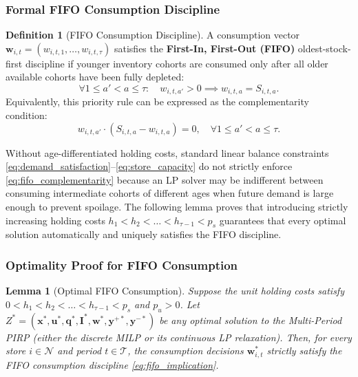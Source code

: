 \documentclass[11pt,a4paper]{article}
\newtheorem{lemma}{Lemma}
\theoremstyle{definition}
\newtheorem{definition}{Definition}
\theoremstyle{remark}
\begin{document}
\subsubsection{Formal FIFO Consumption Discipline}
\begin{definition}[FIFO Consumption Discipline]
\label{def:fifo_discipline}
A consumption vector $\mathbf{w}_{i,t} = (w_{i,t,1}, \dots, w_{i,t,\tau})$ satisfies the \textbf{First-In, First-Out (FIFO)} oldest-stock-first discipline if younger inventory cohorts are consumed only after all older available cohorts have been fully depleted:
\begin{equation}
    \forall 1 \le a' < a \le \tau: \quad w_{i,t,a'} > 0 \implies w_{i,t,a} = S_{i,t,a}. \label{eq:fifo_implication}
\end{equation}
Equivalently, this priority rule can be expressed as the complementarity condition:
\begin{equation}
    w_{i,t,a'} \cdot \left( S_{i,t,a} - w_{i,t,a} \right) = 0, \quad \forall 1 \le a' < a \le \tau. \label{eq:fifo_complementarity}
\end{equation}
\end{definition}

Without age-differentiated holding costs, standard linear balance constraints \eqref{eq:demand_satisfaction}--\eqref{eq:store_capacity} do not strictly enforce \eqref{eq:fifo_complementarity} because an LP solver may be indifferent between consuming intermediate cohorts of different ages when future demand is large enough to prevent spoilage. The following lemma proves that introducing strictly increasing holding costs $h_1 < h_2 < \dots < h_{\tau-1} < p_s$ guarantees that every optimal solution automatically and uniquely satisfies the FIFO discipline.

\subsubsection{Optimality Proof for FIFO Consumption}
\begin{lemma}[Optimal FIFO Consumption]
\label{lem:fifo_optimality}
Suppose the unit holding costs satisfy $0 < h_1 < h_2 < \dots < h_{\tau-1} < p_s$ and $p_u > 0$. Let $Z^* = (\mathbf{x}^*, \mathbf{u}^*, \mathbf{q}^*, \mathbf{I}^*, \mathbf{w}^*, \mathbf{y}^{+*}, \mathbf{y}^{-*})$ be any optimal solution to the Multi-Period PIRP (either the discrete MILP or its continuous LP relaxation). Then, for every store $i \in \mathcal{N}$ and period $t \in \mathcal{T}$, the consumption decisions $\mathbf{w}_{i,t}^*$ strictly satisfy the FIFO consumption discipline \eqref{eq:fifo_implication}.
\end{lemma}
\end{document}
